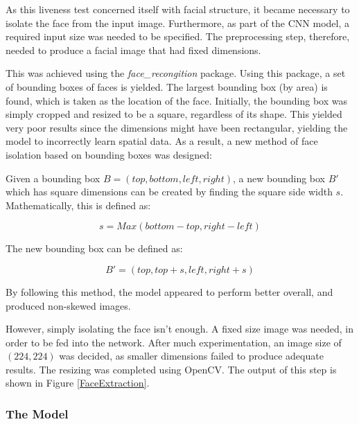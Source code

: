 \documentclass[10pt,a4paper]{article}
\begin{document}
            As this liveness test concerned itself with facial structure, it became necessary to isolate the face from the input image. Furthermore, as part of the CNN model, a required input size was needed to be specified. 
            The preprocessing step, therefore, needed to produce a facial image that had fixed dimensions.

            This was achieved using the \emph{face\_recongition} package. Using this package, a set of bounding boxes of faces is yielded. The largest bounding box (by area) is found, which is taken as the location of the face. Initially, the bounding box was simply cropped and resized to be a square, regardless of its shape. This yielded very poor results  since the dimensions might have been rectangular, yielding the model to incorrectly learn spatial data. As a result, a new method of face isolation based on bounding boxes was designed:
            
            Given a bounding box $B = (top, bottom, left, right)$, a new bounding box $B'$ which has square dimensions can be created by finding the square
            side width $s$. Mathematically, this is defined as:

                $$s = Max(bottom - top, right - left)$$


                The new bounding box can be defined as:


                $$B' = (top, top + s, left, right + s)$$


                By following this method, the model appeared to perform better overall, and produced non-skewed images.

                However, simply isolating the face isn't enough. A fixed size image was needed, in order to be fed into the network. After much experimentation, an image size of $(224, 224)$
                was decided, as smaller dimensions failed to produce adequate results. The resizing was completed using OpenCV. The output of this step is shown in Figure \ref{FaceExtraction}.

                
            \subsubsection{The Model}
                    
\end{document}
